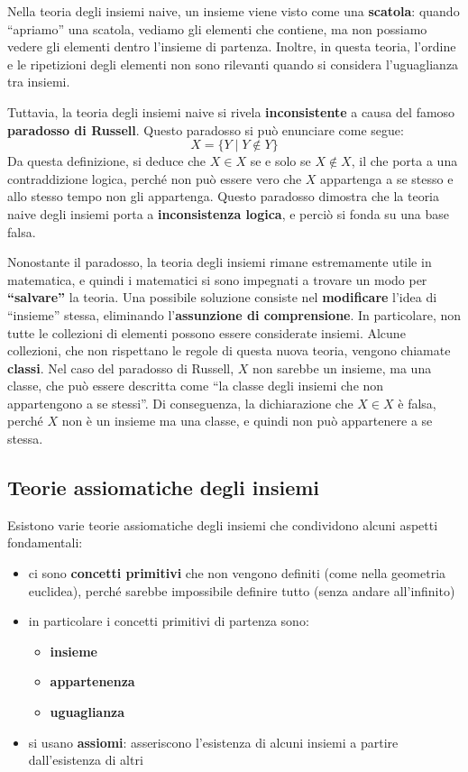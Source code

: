 \documentclass[
  a4paper,
]{article}
\providecommand{\tightlist}{%
  \setlength{\itemsep}{0pt}\setlength{\parskip}{0pt}}
\begin{document}
Nella teoria degli insiemi naive, un insieme viene visto come una
\textbf{scatola}: quando ``apriamo'' una scatola, vediamo gli elementi
che contiene, ma non possiamo vedere gli elementi dentro l'insieme di
partenza. Inoltre, in questa teoria, l'ordine e le ripetizioni degli
elementi non sono rilevanti quando si considera l'uguaglianza tra
insiemi.

Tuttavia, la teoria degli insiemi naive si rivela \textbf{inconsistente}
a causa del famoso \textbf{paradosso di Russell}. Questo paradosso si
può enunciare come segue: \[
X = \{ Y \mid Y \notin Y \}
\] Da questa definizione, si deduce che \(X \in X\) se e solo se
\(X \notin X\), il che porta a una contraddizione logica, perché non può
essere vero che \(X\) appartenga a se stesso e allo stesso tempo non gli
appartenga. Questo paradosso dimostra che la teoria naive degli insiemi
porta a \textbf{inconsistenza logica}, e perciò si fonda su una base
falsa.

Nonostante il paradosso, la teoria degli insiemi rimane estremamente
utile in matematica, e quindi i matematici si sono impegnati a trovare
un modo per \textbf{``salvare''} la teoria. Una possibile soluzione
consiste nel \textbf{modificare} l'idea di ``insieme'' stessa,
eliminando l'\textbf{assunzione di comprensione}. In particolare, non
tutte le collezioni di elementi possono essere considerate insiemi.
Alcune collezioni, che non rispettano le regole di questa nuova teoria,
vengono chiamate \textbf{classi}. Nel caso del paradosso di Russell,
\(X\) non sarebbe un insieme, ma una classe, che può essere descritta
come ``la classe degli insiemi che non appartengono a se stessi''. Di
conseguenza, la dichiarazione che \(X \in X\) è falsa, perché \(X\) non
è un insieme ma una classe, e quindi non può appartenere a se stessa.

\hypertarget{teorie-assiomatiche-degli-insiemi}{%
\subsection{Teorie assiomatiche degli
insiemi}\label{teorie-assiomatiche-degli-insiemi}}

Esistono varie teorie assiomatiche degli insiemi che condividono alcuni
aspetti fondamentali:

\begin{itemize}
\item
  ci sono \textbf{concetti primitivi} che non vengono definiti (come
  nella geometria euclidea), perché sarebbe impossibile definire tutto
  (senza andare all'infinito)
\item
  in particolare i concetti primitivi di partenza sono:

  \begin{itemize}
  \tightlist
  \item
    \textbf{insieme}
  \item
    \textbf{appartenenza}
  \item
    \textbf{uguaglianza}
  \end{itemize}
\item
  si usano \textbf{assiomi}: asseriscono l'esistenza di alcuni insiemi a
  partire dall'esistenza di altri
\end{itemize}
\end{document}
